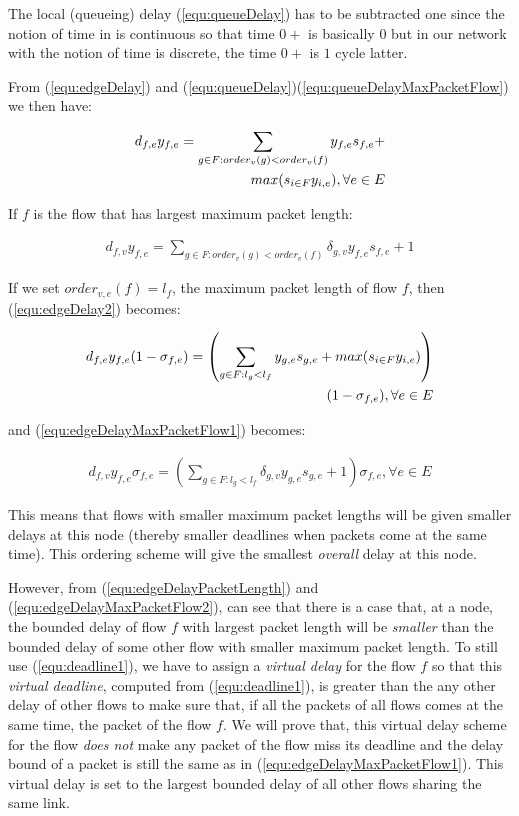 \documentclass[conference, twocolumn]{IEEEtran}
\theoremstyle{definition}
\begin{document}
The local (queueing) delay (\ref{equ:queueDelay}) has to be subtracted one since
the notion of time in \cite{Ferrari90ascheme} is continuous so that time $0+$ is basically $0$ but in
our network with the notion of time is discrete, the time $0+$ is $1$ cycle
latter.

From (\ref{equ:edgeDelay}) and
(\ref{equ:queueDelay})(\ref{equ:queueDelayMaxPacketFlow}) we then have:

\begin{eqnarray}\label{equ:edgeDelay2}
d_{f,e}y_{f,e} = \sum_{g \in F:order_v(g) < order_v(f)}y_{f,e}s_{f,e} + \notag
\\ max(s_{i \in F}y_{i,e}), \forall e \in E
\end{eqnarray}

If $f$ is the flow that has largest maximum packet length:

\begin{eqnarray}\label{equ:edgeDelayMaxPacketFlow1}
d_{f,v}y_{f,e} = \sum_{g \in F:order_v(g) <
order_v(f)}\delta_{g,v}y_{f,e}s_{f,e} + 1
\end{eqnarray}

If we set $order_{v,e}(f)=l_f$, the maximum packet length of flow $f$, then
(\ref{equ:edgeDelay2}) becomes:

\begin{eqnarray}\label{equ:edgeDelayPacketLength}
d_{f,e}y_{f,e}(1-\sigma_{f,e}) = \left(\sum_{g \in F:l_g <
l_f}y_{g,e}s_{g,e} + max(s_{i \in F}y_{i,e})\right) \notag \\
(1-\sigma_{f,e}), \forall e \in E
\end{eqnarray}

and (\ref{equ:edgeDelayMaxPacketFlow1}) becomes:

\begin{eqnarray}\label{equ:edgeDelayMaxPacketFlow2}
d_{f,v}y_{f,e}\sigma_{f,e} = \left(\sum_{g \in F:l_g <
l_f}\delta_{g,v}y_{g,e}s_{g,e} + 1\right)\sigma_{f,e}, \forall e \in E
\end{eqnarray}

This means that flows with smaller maximum packet lengths will be given smaller
delays at this node (thereby smaller deadlines when packets come at the same
time). This ordering scheme will give the smallest {\em overall} delay at this node.

However, from (\ref{equ:edgeDelayPacketLength})
and (\ref{equ:edgeDelayMaxPacketFlow2}), can see that there is a case that, at
a node, the bounded delay of flow $f$ with largest packet length will be {\em
smaller} than the bounded delay of some other flow with smaller maximum packet
length. To still use (\ref{equ:deadline1}), we have to assign a {\em virtual
delay} for the flow $f$ so that this {\em virtual deadline}, computed from
(\ref{equ:deadline1}), is greater than the any other delay of other flows to
make sure that, if all the packets of all flows comes at the same time, the packet
of the flow $f$. We will prove that, this virtual delay scheme for the flow
{\em does not} make any packet of the flow miss its deadline and the delay
bound of a packet is still the same as in (\ref{equ:edgeDelayMaxPacketFlow1}).
This virtual delay is set to the largest bounded delay of all other flows
sharing the same link.
\end{document}
